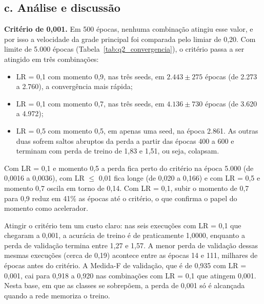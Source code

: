 
\subsection*{c. Análise e discussão}

\textbf{Critério de 0,001.} Em 500 épocas, nenhuma combinação atingiu esse valor, e por isso a velocidade da grade principal foi comparada
pelo limiar de 0,20. Com limite de 5.000 épocas (Tabela~\ref{tab:q2_convergencia}), o critério passa a ser atingido em três combinações:
\begin{itemize}
  \item LR = 0,1 com momento 0,9, nas três seeds, em $2.443 \pm 275$ épocas (de 2.273 a 2.760), a convergência mais rápida;
  \item LR = 0,1 com momento 0,7, nas três seeds, em $4.136 \pm 730$ épocas (de 3.620 a 4.972);
  \item LR = 0,5 com momento 0,5, em apenas uma seed, na época 2.861. As outras duas sofrem saltos abruptos da perda a partir das
    épocas 400 a 600 e terminam com perda de treino de 1,83 e 1,51, ou seja, colapsam.
\end{itemize}
Com LR = 0,1 e momento 0,5 a perda fica perto do critério na época 5.000 (de 0,0016 a 0,0036), com LR $\le$ 0,01 fica longe (de 0,020 a 0,166)
e com LR = 0,5 e momento 0,7 oscila em torno de 0,14.
Com LR = 0,1, subir o momento de 0,7 para 0,9 reduz em 41\% as épocas até o critério, o que confirma o papel do momento como acelerador.

Atingir o critério tem um custo claro: nas seis execuções com LR = 0,1 que chegaram a 0,001, a acurácia de treino é de praticamente 1,0000,
enquanto a perda de validação termina entre 1,27 e 1,57. A menor perda de validação dessas mesmas execuções (cerca de 0,19) acontece entre as
épocas 14 e 111, milhares de épocas antes do critério. A Medida-F de validação, que é de 0,935 com LR = 0,001, cai para 0,918 a 0,920 nas
combinações com LR = 0,1 que atingem 0,001. Nesta base, em que as classes se sobrepõem, a perda de 0,001 só é alcançada quando a rede memoriza o treino.

